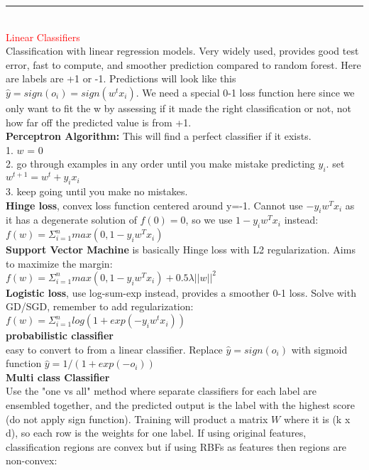 \documentclass[8pt]{extarticle}
\begin{document}
\begin{multicols*}{2}
\rule{\linewidth}{0.5mm} 
\\
\textcolor{red}{Linear Classifiers}
\\
Classification with linear regression models. Very widely used, provides good test error, fast to compute, and smoother prediction compared to random forest. Here are labels are +1 or -1. Predictions will look like this $\hat{y} = sign(o_i) = sign(w^tx_i)$. We need a special 0-1 loss function here since we only want to fit the w by assessing if it made the right classification or not, not how far off the predicted value is from +1.
\\
\textbf{Perceptron Algorithm:} This will find a perfect classifier if it exists.
\\
1. $w$ = 0
\\
2. go through examples in any order until you make mistake predicting $y_i$. set $w^{t+1} = w^t+y_ix_i$
\\
3. keep going until you make no mistakes.
\\
\textbf{Hinge loss}, convex loss function centered around y=-1. Cannot use $-y_iw^Tx_i$ as it has a degenerate solution of $f(0) = 0$, so we use $1-y_iw^Tx_i$ instead:
\\
$f(w) = \Sigma_{i=1}^nmax(0, 1-y_iw^Tx_i)$
\\
\textbf{Support Vector Machine} is basically Hinge loss with L2 regularization. Aims to maximize the margin:
\\
$f(w) = \Sigma_{i=1}^nmax(0, 1-y_iw^Tx_i) + 0.5\lambda||w||^2$
\\
\textbf{Logistic loss}, use log-sum-exp instead, provides a smoother 0-1 loss. Solve with GD/SGD, remember to add regularization:
\\
$f(w) = \Sigma_{i=1}^nlog(1+exp(-y_iw^tx_i))$
\\
\textbf{probabilistic classifier} 
\\
easy to convert to from a linear classifier. Replace $\hat{y} = sign(o_i)$ with sigmoid function $\hat{y} = 1/(1+exp(-o_i))$
\\
\textbf{Multi class Classifier} 
\\
Use the "one vs all" method where separate classifiers for each label are ensembled together, and the predicted output is the label with the highest score (do not apply sign function). Training will product a matrix $W$ where it is (k x d), so each row is the weights for one label. If using original features, classification regions are convex but if using RBFs as features then regions are non-convex:
\\

\end{multicols*}
\end{document}
